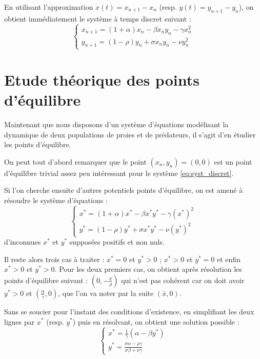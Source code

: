 En utilisant l'approximation $\dot{x}(t) = x_{n+1} - x_n$ (resp. $\dot{y}(t) = y_{n+1} - y_n$), on obtient immédiatement le système à temps discret suivant :
\begin{equation}
    \label{eq:syst_discret}
    \begin{cases}
        x_{n+1} = (1 + \alpha) x_n - \beta x_n y_n - \gamma x_n^2 \\
        y_{n+1} = (1 - \rho) y_n + \sigma x_n y_n - \nu y_n^2
    \end{cases}
\end{equation}


\section{Etude théorique des points d'équilibre}
\label{sec:etude_theorique}

Maintenant que nous disposons d'un système d'équations modélisant la dynamique de deux populations de proies et de prédateurs, il s'agit d'en étudier les points d'équilibre.

On peut tout d'abord remarquer que le point $(x_n, y_n) = (0, 0)$ est un point d'équilibre trivial assez peu intéressant pour le système \ref{eq:syst_discret}.

Si l'on cherche ensuite d'autres potentiels points d'équilibre, on est amené à résoudre le système d'équations :
\begin{equation}
    \begin{cases}
        x^* = (1 + \alpha) x^* - \beta x^* y^* - \gamma (x^*)^2 \\
        y^* = (1 - \rho) y^* + \sigma x^* y^* - \nu (y^*)^2
    \end{cases}
\end{equation}
d'inconnues $x^*$ et $y^*$ supposées positifs et non nuls.

Il reste alors trois cas à traiter : $x^* = 0$ et $y^* > 0$ ; $x^* > 0$ et $y^* = 0$ et enfin $x^* > 0$ et $y^* > 0$.
Pour les deux premiers cas, on obtient après résolution les points d'équilibre suivant : $(0, - \frac{\nu}{\rho})$ qui n'est pas cohérent car on doit avoir $y^* > 0$ et $(\frac{\alpha}{\gamma}, 0)$, que l'on va noter par la suite $(\bar{x}, 0)$.

Sans se soucier pour l'instant des conditions d'existence, en simplifiant les deux lignes par $x^*$ (resp. $y^*$) puis en résolvant, on obtient une solution possible :
\begin{equation}
    \label{eq:equilibre}
    \begin{cases}
        x^* = \frac{1}{\gamma} (\alpha - \beta y^*) \\
        y^* = \frac{\sigma \alpha - \rho \gamma}{\sigma \beta + \nu \gamma}
    \end{cases}
\end{equation}

